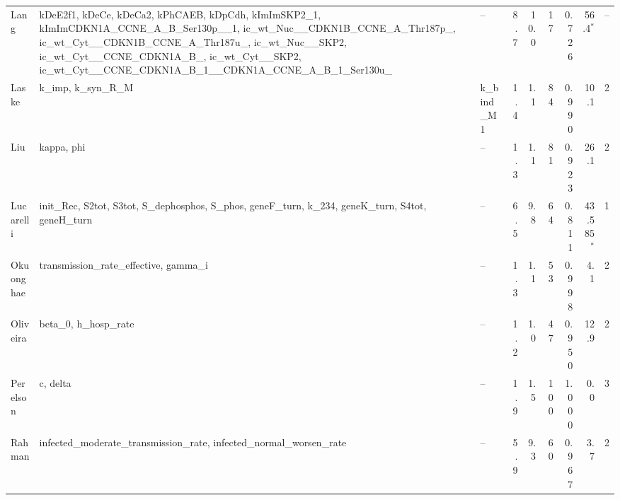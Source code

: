 \begin{longtable}{@{}>{\raggedright\arraybackslash}p{1.9cm}>{\raggedright\arraybackslash}p{3.9cm}>{\raggedright\arraybackslash}p{2.7cm}rrrrrc@{}}
Lang & kDeE2f1, \allowbreak{}kDeCe, \allowbreak{}kDeCa2, \allowbreak{}kPhCAEB, \allowbreak{}kDpCdh, \allowbreak{}kImImSKP2\_\allowbreak{}1, \allowbreak{}kImImCDKN1A\_\allowbreak{}CCNE\_\allowbreak{}A\_\allowbreak{}B\_\allowbreak{}Ser130p\_\allowbreak{}\_\allowbreak{}1, \allowbreak{}ic\_\allowbreak{}wt\_\allowbreak{}Nuc\_\allowbreak{}\_\allowbreak{}CDKN1B\_\allowbreak{}CCNE\_\allowbreak{}A\_\allowbreak{}Thr187p\_\allowbreak{}, \allowbreak{}ic\_\allowbreak{}wt\_\allowbreak{}Cyt\_\allowbreak{}\_\allowbreak{}CDKN1B\_\allowbreak{}CCNE\_\allowbreak{}A\_\allowbreak{}Thr187u\_\allowbreak{}, \allowbreak{}ic\_\allowbreak{}wt\_\allowbreak{}Nuc\_\allowbreak{}\_\allowbreak{}SKP2, \allowbreak{}ic\_\allowbreak{}wt\_\allowbreak{}Cyt\_\allowbreak{}\_\allowbreak{}CCNE\_\allowbreak{}CDKN1A\_\allowbreak{}B\_\allowbreak{}, \allowbreak{}ic\_\allowbreak{}wt\_\allowbreak{}Cyt\_\allowbreak{}\_\allowbreak{}SKP2, \allowbreak{}ic\_\allowbreak{}wt\_\allowbreak{}Cyt\_\allowbreak{}\_\allowbreak{}CCNE\_\allowbreak{}CDKN1A\_\allowbreak{}B\_\allowbreak{}1\_\allowbreak{}\_\allowbreak{}CDKN1A\_\allowbreak{}CCNE\_\allowbreak{}A\_\allowbreak{}B\_\allowbreak{}1\_\allowbreak{}Ser130u\_\allowbreak{} & -- & 8.7 & 10.0 & 17 & 0.726 & 56.4$^{\ast}$ & -- \\
Laske & k\_\allowbreak{}imp, \allowbreak{}k\_\allowbreak{}syn\_\allowbreak{}R\_\allowbreak{}M & k\_\allowbreak{}bind\_\allowbreak{}M1 & 1.4 & 1.1 & 84 & 0.990 & 10.1 & 2 \\
Liu & kappa, \allowbreak{}phi & -- & 1.3 & 1.1 & 81 & 0.923 & 26.1 & 2 \\
Lucarelli & init\_\allowbreak{}Rec, \allowbreak{}S2tot, \allowbreak{}S3tot, \allowbreak{}S\_\allowbreak{}dephosphos, \allowbreak{}S\_\allowbreak{}phos, \allowbreak{}geneF\_\allowbreak{}turn, \allowbreak{}k\_\allowbreak{}234, \allowbreak{}geneK\_\allowbreak{}turn, \allowbreak{}S4tot, \allowbreak{}geneH\_\allowbreak{}turn & -- & 6.5 & 9.8 & 64 & 0.811 & 43.585$^{\ast}$ & 1 \\
Okuonghae & transmission\_\allowbreak{}rate\_\allowbreak{}effective, \allowbreak{}gamma\_\allowbreak{}i & -- & 1.3 & 1.1 & 53 & 0.998 & 4.1 & 2 \\
Oliveira & beta\_\allowbreak{}0, \allowbreak{}h\_\allowbreak{}hosp\_\allowbreak{}rate & -- & 1.2 & 1.0 & 47 & 0.950 & 12.9 & 2 \\
Perelson & c, \allowbreak{}delta & -- & 1.9 & 1.5 & 100 & 1.000 & 0.0 & 3 \\
Rahman & infected\_\allowbreak{}moderate\_\allowbreak{}transmission\_\allowbreak{}rate, \allowbreak{}infected\_\allowbreak{}normal\_\allowbreak{}worsen\_\allowbreak{}rate & -- & 5.9 & 9.3 & 60 & 0.967 & 3.7 & 2 \\

\end{longtable}

